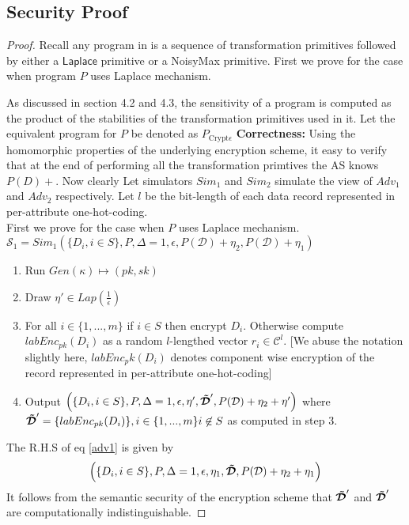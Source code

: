 \subsection{Security Proof}
\begin{proof}
Recall any program in \system is a sequence of transformation primitives followed by either a $\textsf{Laplace}$ primitive or a \textsf{NoisyMax} primitive. First we prove for the case when program $P$ uses Laplace mechanism.

As discussed in section 4.2 and 4.3, the sensitivity of a \system program is computed as the product of the stabilities of the transformation primitives used in it.
Let the equivalent \system program for $P$ be denoted as $P_{\mbox{Crypt}\epsilon}$
\textbf{Correctness:}
 Using the homomorphic properties of the underlying encryption
scheme, it easy to verify that at the end of performing all the transformation primtives the \textsf{AS} knows $P(D)+$.  Now clearly 
Let simulators $Sim_1$ and $Sim_2$ simulate the view of ${Adv}_1$ and $Adv_2$ respectively. 
Let $l$ be the bit-length of each data record represented in per-attribute one-hot-coding. \\
First we prove for the case when $P$ uses Laplace mechanism.
$\mathcal{S}_1=Sim_1(\{D_i, i \in S\}, P,\Delta=1,\epsilon, P(\mathcal{D})+\eta_2,P(\mathcal{D})+\eta_1)$
\begin{enumerate}\item Run $Gen(\kappa)\mapsto (pk,sk)$ 
\item Draw $\eta' \in Lap(\frac{1}{\epsilon})$
\item For all $i \in \{1,...,m\}$ if $i \in S$ then encrypt $D_i$. 
Otherwise compute $labEnc_{pk}(D_i)$ as a random $l$-lengthed vector $r_i \in \mathcal{C}^l$. [We abuse the notation slightly here, $labEnc_pk(D_i)$ denotes component wise encryption of the record represented in per-attribute one-hot-coding]
\item Output $\Big(\{D_i, i \in S\},P,\Delta=1,\epsilon,\eta',\boldsymbol{\tilde{\mathcal{D}}}',P(\mathcal{D})+\eta_2+\eta'\Big)$ where $\boldsymbol{\tilde{\mathcal{D}}}'=\{labEnc_{pk}(D_i)\},i \in \{1,...,m\} i \not \in S$ as computed in step 3.
\end{enumerate}
The R.H.S of eq \ref{adv1}  is given by 
\begin{gather}\Big(\{D_i, i \in S\},P,\Delta=1,\epsilon, \eta_1,\boldsymbol{\tilde{\mathcal{D}}},P(\mathcal{D})+\eta_2+\eta_1\Big)\end{gather}
It follows from the semantic security of the encryption scheme that $\boldsymbol{\tilde{\mathcal{D}}}'$ and $\boldsymbol{\tilde{\mathcal{D}}}'$ are computationally indistinguishable.

\end{proof}
